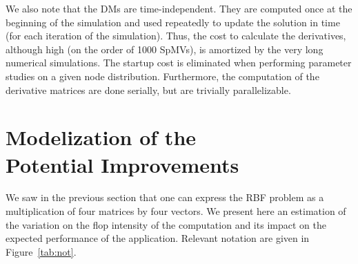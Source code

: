 \documentclass{sig-alternate}
\def\ee#1{{#1}}
\def\ger#1{#1}
\begin{document}
We also note that the DMs are time-independent. They are computed once \ee{at the beginning of the simulation} and used repeatedly to update the solution 
in time (for each iteration of the simulation). Thus, the cost to calculate the derivatives, although high \ger{(on the order of 1000 SpMVs)}, 
is amortized by the very long numerical simulations. \ger{The startup cost is eliminated when performing parameter studies on a given node distribution. Furthermore, the computation of the derivative matrices are done serially, but are trivially parallelizable.}


\section{Modelization of the \\Potential Improvements}
\label{sec:model}

We saw in the previous section that one can express the RBF problem as
a multiplication of four matrices by four vectors. We present here an
estimation of the variation on the flop intensity of the computation
and its impact on the expected performance of the
application. Relevant notation are given in Figure~\ref{tab:not}.
\end{document}
